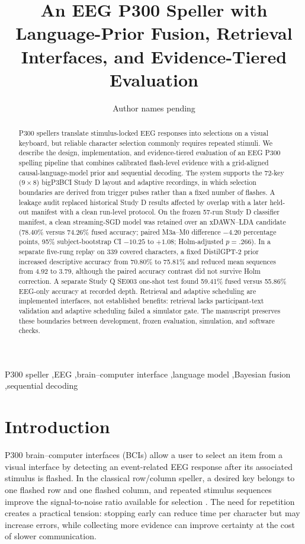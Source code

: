 \documentclass[final,5p,times,twocolumn,authoryear]{elsarticle}
\begin{document}
\begin{frontmatter}
\title{An EEG P300 Speller with Language-Prior Fusion, Retrieval Interfaces, and Evidence-Tiered Evaluation}
\author[inst1]{Author names pending}
\address[inst1]{Affiliations pending}

\begin{abstract}
P300 spellers translate stimulus-locked EEG responses into selections on a visual keyboard, but reliable character selection commonly requires repeated stimuli. We describe the design, implementation, and evidence-tiered evaluation of an EEG P300 spelling pipeline that combines calibrated flash-level evidence with a grid-aligned causal-language-model prior and sequential decoding. The system supports the 72-key ($9\times8$) bigP3BCI Study D layout and adaptive recordings, in which selection boundaries are derived from trigger pulses rather than a fixed number of flashes. A leakage audit replaced historical Study D results affected by overlap with a later held-out manifest with a clean run-level protocol. On the frozen 57-run Study D classifier manifest, a clean streaming-SGD model was retained over an xDAWN--LDA candidate (78.40\% versus 74.26\% fused accuracy; paired M3a--M0 difference $-4.20$ percentage points, 95\% subject-bootstrap CI $-10.25$ to $+1.08$; Holm-adjusted $p=.266$). In a separate five-rung replay on 339 covered characters, a fixed DistilGPT-2 prior increased descriptive accuracy from 70.80\% to 75.81\% and reduced mean sequences from 4.92 to 3.79, although the paired accuracy contrast did not survive Holm correction. A separate Study Q SE003 one-shot test found 59.41\% fused versus 55.86\% EEG-only accuracy at recorded depth. Retrieval and adaptive scheduling are implemented interfaces, not established benefits: retrieval lacks participant-text validation and adaptive scheduling failed a simulator gate. The manuscript preserves these boundaries between development, frozen evaluation, simulation, and software checks.
\end{abstract}

\begin{keyword}
P300 speller \sep EEG \sep brain--computer interface \sep language model \sep Bayesian fusion \sep sequential decoding
\end{keyword}
\end{frontmatter}

\section{Introduction}
P300 brain--computer interfaces (BCIs) allow a user to select an item from a visual interface by detecting an event-related EEG response after its associated stimulus is flashed. In the classical row/column speller, a desired key belongs to one flashed row and one flashed column, and repeated stimulus sequences improve the signal-to-noise ratio available for selection \citep{farwell1988,krusienski2008}. The need for repetition creates a practical tension: stopping early can reduce time per character but may increase errors, while collecting more evidence can improve certainty at the cost of slower communication.
\end{document}
